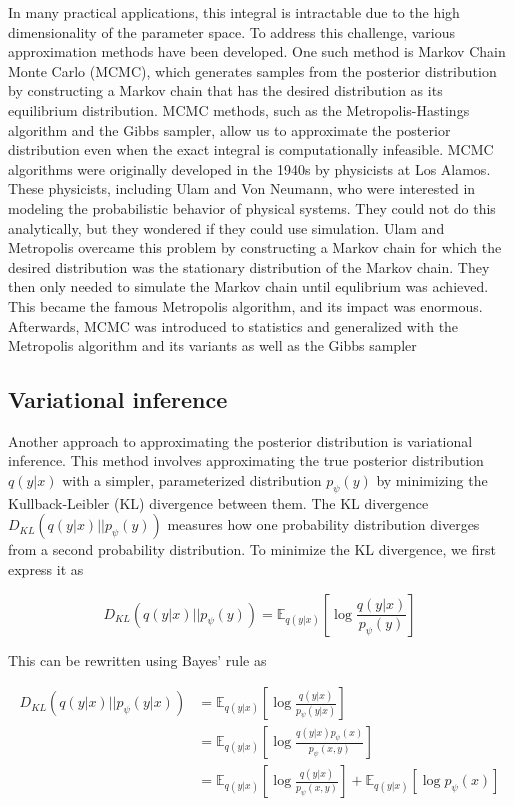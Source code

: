 In many practical applications, this integral is intractable due to the high dimensionality of the parameter space. To address this challenge, various approximation methods have been developed. One such method is Markov Chain Monte Carlo (MCMC), which generates samples from the posterior distribution by constructing a Markov chain that has the desired distribution as its equilibrium distribution. MCMC methods, such as the Metropolis-Hastings algorithm and the Gibbs sampler, allow us to approximate the posterior distribution even when the exact integral is computationally infeasible. MCMC algorithms were originally developed in the 1940s by physicists at Los Alamos. These physicists, including Ulam and Von Neumann, who were interested in modeling the probabilistic behavior of physical systems. They could not do this analytically, but they wondered if they could use simulation. Ulam and Metropolis overcame this problem by constructing a Markov chain for which the desired distribution was the stationary distribution of the Markov chain. They then only needed to simulate the Markov chain until equlibrium was achieved. This became the famous Metropolis algorithm, and its impact was enormous. Afterwards, MCMC was introduced to statistics and generalized with the Metropolis algorithm and its variants as well as the Gibbs sampler \parencite{Geman1984}

\subsection{Variational inference}

Another approach to approximating the posterior distribution is variational inference. This method involves approximating the true posterior distribution \( q(y \lvert x) \) with a simpler, parameterized distribution \( p_{\psi}(y) \) by minimizing the Kullback-Leibler (KL) divergence between them. The KL divergence \( D_{KL}(q(y \lvert x) \lvert\lvert p_{\psi}(y)) \) measures how one probability distribution diverges from a second probability distribution. To minimize the KL divergence, we first express it as

\begin{equation*}
D_{KL}(q(y \lvert x) \lvert\lvert p_{\psi}(y)) = \mathbb{E}_{q(y \lvert x)}\left[\log \frac{q(y \lvert x)}{p_{\psi}(y)}\right]
\end{equation*}

This can be rewritten using Bayes' rule as

\begin{align*}
D_{KL}(q(y \lvert x) \lvert\lvert p_{\psi}(y\lvert x)) &= \mathbb{E}_{q(y \lvert x)}\left[\log \frac{q(y \lvert x)}{p_{\psi}(y\lvert x)}\right] \\
&= \mathbb{E}_{q(y \lvert x)}\left[\log \frac{q(y\lvert x)p_{\psi}(x)}{p_{\psi}(x,y)} \right]\\
&= \mathbb{E}_{q(y \lvert x)}\left[\log \frac{q(y\lvert x)}{p_{\psi}(x,y)} \right] + \mathbb{E}_{q(y \lvert x)}\left[\log p_{\psi}(x) \right]
\end{align*}

